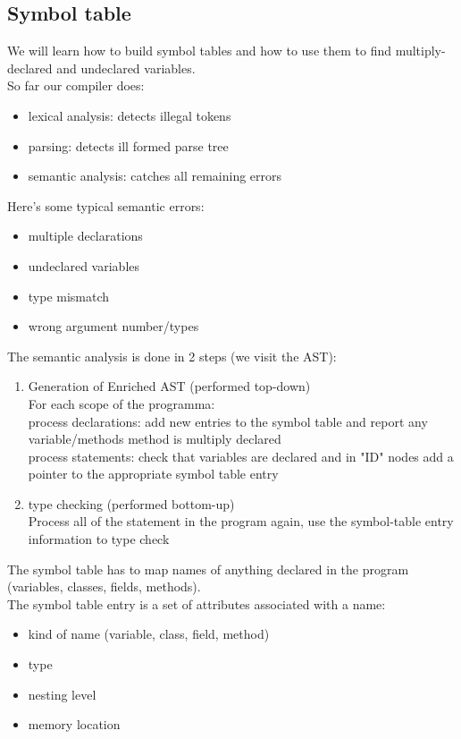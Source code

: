 \documentclass[12pt]{article}
\begin{document}
\subsection{Symbol table}
We will learn how to build symbol tables and how to use them to find multiply-declared and undeclared variables.
\\ So far our compiler does: 
\begin{itemize}
    \item lexical analysis: detects illegal tokens
    \item parsing: detects ill formed parse tree
    \item semantic analysis: catches all remaining errors
\end{itemize}
Here's some typical semantic errors:
\begin{itemize}
    \item multiple declarations 
    \item undeclared variables 
    \item type mismatch
    \item wrong argument number/types
\end{itemize}
The semantic analysis is done in 2 steps (we visit the AST):
\begin{enumerate}
    \item Generation of Enriched AST (performed top-down)
        \\ For each scope of the programma: 
        \\ process declarations: add new entries to the symbol table and report any variable/methods method is multiply declared 
        \\ process statements: check that variables are declared and in "ID" nodes add a pointer to the appropriate symbol table entry
    \item type checking (performed bottom-up)
        \\ Process all of the statement in the program again, use the symbol-table entry information to type check
\end{enumerate}
The symbol table has to map names of anything declared in the program (variables, classes, fields, methods).
\\ The symbol table entry is a set of attributes associated with a name: 
\begin{itemize}
    \item kind of name (variable, class, field, method)
    \item type 
    \item nesting level
    \item memory location
\end{itemize}
\end{document}
